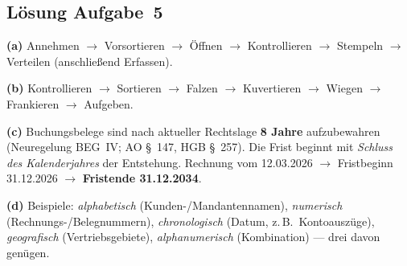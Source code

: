 \documentclass[11pt, a4paper]{article}
\begin{document}
\subsection*{Lösung Aufgabe~5}
\begin{loesung}
\textbf{(a)} Annehmen $\rightarrow$ Vorsortieren $\rightarrow$ Öffnen $\rightarrow$
Kontrollieren $\rightarrow$ Stempeln $\rightarrow$ Verteilen (anschließend Erfassen).

\textbf{(b)} Kontrollieren $\rightarrow$ Sortieren $\rightarrow$ Falzen $\rightarrow$
Kuvertieren $\rightarrow$ Wiegen $\rightarrow$ Frankieren $\rightarrow$ Aufgeben.

\textbf{(c)} Buchungsbelege sind nach aktueller Rechtslage \textbf{8 Jahre} aufzubewahren
(Neuregelung BEG~IV; AO \S~147, HGB \S~257). Die Frist beginnt mit \emph{Schluss des
Kalenderjahres} der Entstehung. Rechnung vom 12.03.2026 $\rightarrow$ Fristbeginn
31.12.2026 $\rightarrow$ \textbf{Fristende 31.12.2034}.

\textbf{(d)} Beispiele: \emph{alphabetisch} (Kunden-/Mandantennamen), \emph{numerisch}
(Rechnungs-/Belegnummern), \emph{chronologisch} (Datum, z.\,B.\ Kontoauszüge),
\emph{geografisch} (Vertriebsgebiete), \emph{alphanumerisch} (Kombination) --- drei davon
genügen.
\end{loesung}
\end{document}
